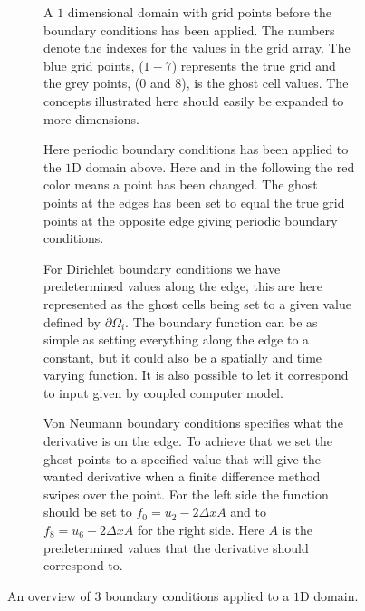 	\begin{figure}
		\centering
		\begin{subfigure}[b]{0.9\textwidth}
			\centering
			
			\caption{A \(1\) dimensional domain with grid points before the boundary conditions has been applied.
			The numbers denote the indexes for the values in the grid array. The blue grid points, (\(1-7\)) represents
			the true grid and the grey points, ($0$ and $8$), is the ghost cell values. The concepts illustrated here should easily be
			expanded to more dimensions.}
			\label{fig:initial}
		\end{subfigure}
		\begin{subfigure}[b]{0.9\textwidth}
			\centering
			
			\caption{Here periodic boundary conditions has been applied to the \(1\)D domain above. Here and in the following the
			red color means a point has been changed. The ghost points at the edges has been set to equal the
			true grid points at the opposite edge giving periodic boundary conditions.}
			\label{fig:periodic}
		\end{subfigure}
		\begin{subfigure}[b]{0.9\textwidth}
			\centering
			
			\caption{For Dirichlet boundary conditions we have predetermined values along the edge, this are here represented as the ghost cells
			being set to a given value defined by \(\partial\Omega_i\). The boundary function can be as simple as setting everything along
			the edge to a constant, but it could also be a spatially and time varying function. It is also possible to let it correspond to
			input given by coupled computer model.}
			\label{fig:dirichlet}
		\end{subfigure}
		\begin{subfigure}[b]{0.9\textwidth}
			\centering
			
			\caption{Von Neumann boundary conditions specifies what the derivative is on the edge. To achieve that we set the ghost points to
			a specified value that will give the wanted derivative when a finite difference method swipes over the point. For the left side
			the function should be set to \(f_0 = u_2 - 2\Delta x A\) and to \(f_8 = u_6 - 2\Delta x A\) for the right side. Here \(A\) is the
			predetermined values that the derivative should correspond to.}
			\label{fig:neumann}
		\end{subfigure}
		\caption{An overview of 3 boundary conditions applied to a \(1\)D domain.}
		\label{fig:bnd}
	\end{figure}



